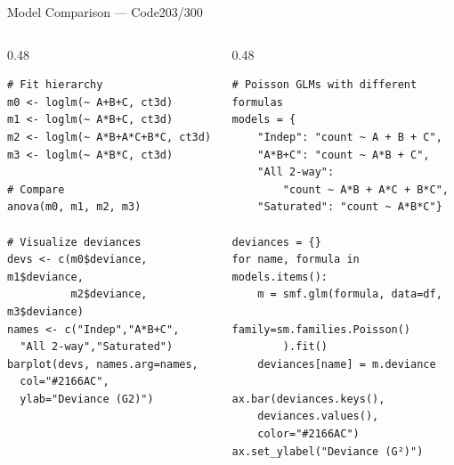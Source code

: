 \documentclass[10pt]{beamer}
\newcommand{\smark}[1]{\hfill{\scriptsize\color{codegray}#1}}
\begin{document}
\begin{frame}[fragile]{Model Comparison --- Code}\smark{203/300}
\begin{columns}[T]
\begin{column}{0.48\textwidth}
\begin{lstlisting}[style=Rstyle]
# Fit hierarchy
m0 <- loglm(~ A+B+C, ct3d)
m1 <- loglm(~ A*B+C, ct3d)
m2 <- loglm(~ A*B+A*C+B*C, ct3d)
m3 <- loglm(~ A*B*C, ct3d)

# Compare
anova(m0, m1, m2, m3)

# Visualize deviances
devs <- c(m0$deviance, m1$deviance,
          m2$deviance, m3$deviance)
names <- c("Indep","A*B+C",
  "All 2-way","Saturated")
barplot(devs, names.arg=names,
  col="#2166AC",
  ylab="Deviance (G2)")
\end{lstlisting}
\end{column}
\begin{column}{0.48\textwidth}
\begin{lstlisting}[style=Pystyle]
# Poisson GLMs with different formulas
models = {
    "Indep": "count ~ A + B + C",
    "A*B+C": "count ~ A*B + C",
    "All 2-way":
        "count ~ A*B + A*C + B*C",
    "Saturated": "count ~ A*B*C"}

deviances = {}
for name, formula in models.items():
    m = smf.glm(formula, data=df,
        family=sm.families.Poisson()
        ).fit()
    deviances[name] = m.deviance

ax.bar(deviances.keys(),
    deviances.values(),
    color="#2166AC")
ax.set_ylabel("Deviance (G²)")
\end{lstlisting}
\end{column}
\end{columns}
\end{frame}
\end{document}
